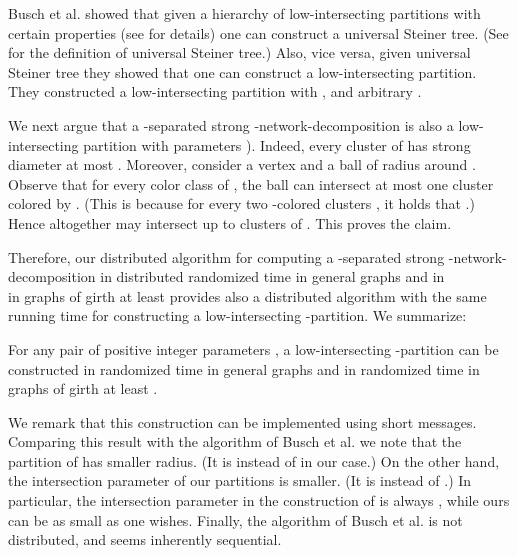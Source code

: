 \documentclass[11pt]{article}
\begin{document}
Busch et al. showed that given a hierarchy of low-intersecting partitions with certain properties (see \cite{BDRRS12} for details) one can construct a universal Steiner tree. (See \cite{BDRRS12} for the definition of universal Steiner tree.) Also, vice versa, given universal Steiner tree they showed that one can construct a low-intersecting partition. They constructed a low-intersecting partition with , and arbitrary .

We next argue that a -separated strong -network-decomposition  is also a low-intersecting partition with parameters ). Indeed, every cluster  of  has strong diameter at most . Moreover, consider a vertex  and a ball  of radius  around . Observe that for every color class  of , the ball  can intersect at most one cluster  colored by . (This is because for every two -colored clusters , it holds that .)
Hence altogether  may intersect up to  clusters of . This proves the claim.

Therefore, our distributed algorithm for computing a -separated strong -network-decomposition in distributed randomized time  in general graphs and in \\  in graphs of girth at least  provides also a distributed algorithm with the same running time for constructing a low-intersecting -partition.
We summarize:
\begin{col}
For any pair of positive integer parameters , a low-intersecting -partition can be constructed in  randomized time in general graphs and in  randomized time in graphs of girth at least .
\end{col}
We remark that this construction can be implemented using short messages. \\ Comparing this result with the algorithm of Busch et al. \cite{BDRRS12} we note that the partition of \cite{BDRRS12} has smaller radius. (It is  instead of  in our case.) On the other hand, the intersection parameter  of our partitions is smaller. (It is  instead of .) In particular, the intersection parameter in the construction of \cite{BDRRS12} is always , while ours can be as small as one wishes. Finally, the algorithm of Busch et al. \cite{BDRRS12} is not distributed, and seems inherently sequential.
\end{document}
